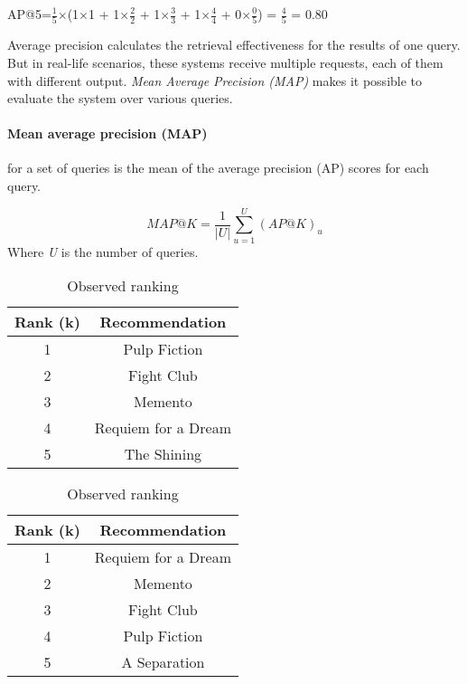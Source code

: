 AP@5=$\frac{1}{5}$$\times$(1$\times$1 + 1$\times$$\frac{2}{2}$ + 1$\times$$\frac{3}{3}$ + 1$\times$$\frac{4}{4}$ + 0$\times$$\frac{0}{5}$) = $\frac{4}{5}$ = 0.80

Average precision calculates the retrieval effectiveness for the results of one query. But in real-life scenarios, these systems receive multiple requests, each of them with different output. \emph{Mean Average Precision (MAP)} makes it possible to evaluate the system over various queries.

\paragraph*{Mean average precision (MAP)} for a set of queries is the mean of the average precision (AP) scores for each query.

\begin{equation}
    MAP@K = \frac{1}{|U|}\sum_{u=1}^{U}(AP@K)_{u}
    \label{eq:map@k}
\end{equation}
Where \emph{U} is the number of queries.

\begin{table}[!htb]
    \caption{Comparing results of objective and observed ranking}
    \label{tab:apk-example}
    \begin{subtable}{.5\linewidth}
        \caption{Objective ranking}
        \centering
        \begin{tabular}{c|c}
            \textbf{Rank (k)}&\textbf{Recommendation} \\
            \hline
            1 & Pulp Fiction \\
            2 & Fight Club \\
            3 & Memento \\
            4 & Requiem for a Dream \\
            5 & The Shining \\
        \end{tabular}
    \end{subtable}%
    \begin{subtable}{.5\linewidth}
        \caption{Observed ranking}
        \centering
        \begin{tabular}{c|c}
            \textbf{Rank (k)}&\textbf{Recommendation} \\
            \hline
            1 & Requiem for a Dream \\
            2 & Memento \\
            3 & Fight Club \\
            4 & Pulp Fiction \\
            5 & A Separation  \\
        \end{tabular}
    \end{subtable}%
\end{table}

